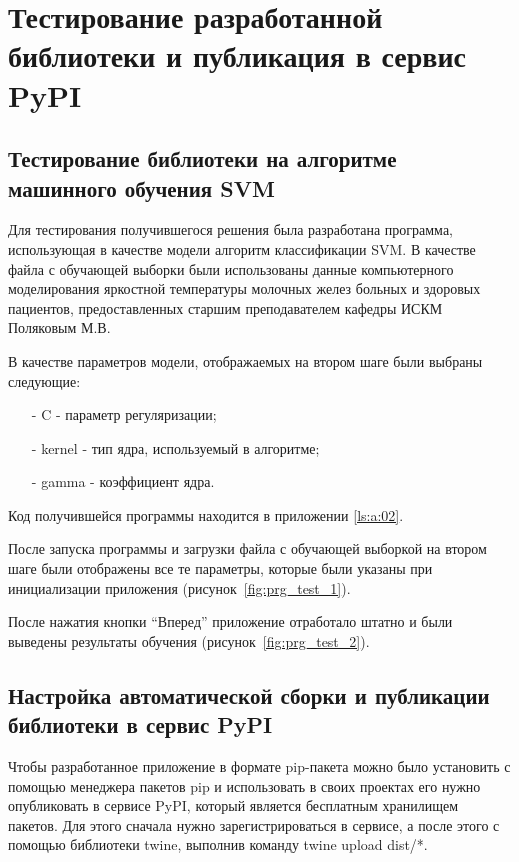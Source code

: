 \chapter{Тестирование разработанной библиотеки и публикация в сервис PyPI}\vspace{-7mm}

\section{Тестирование библиотеки на алгоритме машинного обучения SVM}
Для тестирования получившегося решения была разработана программа, использующая в качестве модели алгоритм классификации SVM. В качестве файла с обучающей выборки были использованы данные компьютерного моделирования яркостной температуры молочных желез больных и здоровых пациентов, предоставленных старшим преподавателем кафедры ИСКМ Поляковым М.В.


В качестве параметров модели, отображаемых на втором шаге были выбраны следующие:
\begin{itemize}
	\item[-] C - параметр регуляризации;
	\item[-] kernel - тип ядра, используемый в алгоритме;
	\item[-] gamma - коэффициент ядра.
\end{itemize}


Код получившейся программы находится в приложении \ref{ls:a:02}.


После запуска программы и загрузки файла с обучающей выборкой на втором шаге были отображены все те параметры, которые были указаны при инициализации приложения (рисунок~\ref{fig:prg_test_1}).




После нажатия кнопки “Вперед” приложение отработало штатно и были выведены результаты обучения (рисунок~\ref{fig:prg_test_2}).



\section{Настройка автоматической сборки и публикации библиотеки в сервис PyPI}

Чтобы разработанное приложение в формате pip-пакета можно было установить с помощью менеджера пакетов pip и использовать в своих проектах его нужно опубликовать в сервисе PyPI, который является бесплатным хранилищем пакетов. Для этого сначала нужно зарегистрироваться в сервисе, а после этого с помощью библиотеки twine, выполнив команду twine upload dist/*. 


